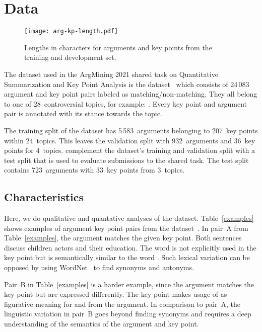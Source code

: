 \section{Data}\label{data}

\begin{figure*}
    \centering
    \texttt{[image: arg-kp-length.pdf]}
    \caption{Lengths in characters for arguments and key points from the training and development set.}
    \label{arg-kp-length}
\end{figure*}

The dataset used in the ArgMining 2021 shared task on Quantitative Summarization and Key Point Analysis is the \ArgKP dataset~\cite{Bar-HaimEFKLS2020} which consists of 24\,083 argument 
and key point pairs labeled as matching/non-matching. They all belong to one of 28~controversial topics, for example: 
. Every key point and argument pair is annotated with its stance towards the topic. 

The training split of the \ArgKP dataset has 5\,583~arguments belonging to 207~key points within 24~topics. This leaves the validation split with 932~arguments and 36~key points for 4~topics.
\citet{kpa-2021-overview} complement the \ArgKP dataset's training and validation split with a test split that is used to evaluate submissions to the shared task. The test split contains 723~arguments with 33~key points from 3~topics.

\subsection{Characteristics}

Here, we do qualitative and quantative analyses of the \ArgKP dataset. Table~\ref{examples} shows examples of argument key point pairs from the \ArgKP dataset~\cite{Bar-HaimEFKLS2020}. 
In pair~A from Table~\ref{examples}, the argument matches the given key point. Both sentences discuss 
children actors and their education. The word  is not explicitly used in the key point but is 
semantically similar to the word . 
Such lexical variation can be opposed by using WordNet~\cite{Miller1995} to find synonyms and antonyms.

Pair~B in Table~\ref{examples} is a harder example, since the argument matches the key point but are expressed differently. 
The key point makes usage of  as figurative meaning for  and  from the argument. 
In comparison to pair~A, the linguistic variation in pair~B goes beyond finding synonyms and requires a deep understanding of the semantics of the argument and key point.


